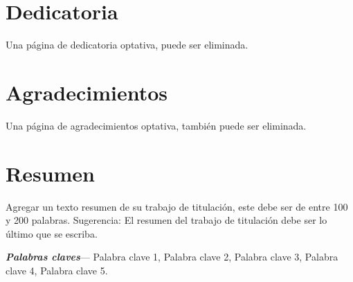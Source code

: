
\chapter*{Dedicatoria}

Una página de dedicatoria optativa, puede ser eliminada.


\chapter*{Agradecimientos}

Una página de agradecimientos optativa, también puede ser eliminada.





\chapter*{Resumen}


Agregar un texto resumen de su trabajo de titulación, este debe ser de entre 100 y 200 palabras. Sugerencia: El resumen del trabajo de titulación debe ser lo último que se escriba.


\vspace{1cm}
\textbf{\textit{Palabras claves}}--- 
Palabra clave 1, Palabra clave 2, Palabra clave 3, Palabra clave 4, Palabra clave 5.






























\newpage
\tableofcontents
\newpage
\listoftables

\listoffigures


